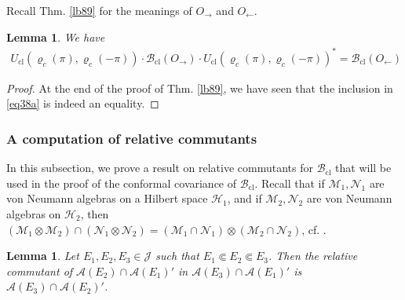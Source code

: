 \documentclass[11pt,b5paper,notitlepage]{article}
\theoremstyle{definition}
\theoremstyle{plain}
\newtheorem{lm}[df]{Lemma}
\newcommand{\mc}{\mathcal}
\newcommand{\MA}{\mathcal A}
\newcommand{\MH}{\mathcal H}
\newcommand{\MJ}{\mathcal J}
\newcommand{\Bcl}{\mathcal B_{\mathrm{cl}}}
\newcommand{\Ucl}{U_{\mathrm{cl}}}
\numberwithin{equation}{section}
\begin{document}
Recall Thm. \ref{lb89} for the meanings of $O_\rightarrow$ and $O_\leftarrow$.

\begin{lm}\label{lb92}
We have
\begin{align*}
\Ucl(\varrho_c(\pi),\varrho_c(-\pi))\cdot\Bcl(O_\rightarrow)\cdot\Ucl(\varrho_c(\pi),\varrho_c(-\pi))^*=\Bcl(O_\leftarrow)
\end{align*}
\end{lm}


\begin{proof}
At the end of the proof of Thm. \ref{lb89}, we have seen that the inclusion in \eqref{eq38a} is indeed an equality.
\end{proof}


\subsubsection{A computation of relative commutants}


In this subsection, we prove a result on relative commutants for $\Bcl$ that will be used in the proof of the conformal covariance of $\Bcl$. Recall that if $\mc M_1,\mc N_1$ are von Neumann algebras on a Hilbert space $\MH_1$, and if $\mc M_2,\mc N_2$ are von Neumann algebras on $\MH_2$, then $(\mc M_1\otimes\mc M_2)\cap(\mc N_1\otimes\mc N_2)=(\mc M_1\cap\mc N_1)\otimes(\mc M_2\cap\mc N_2)$, cf. \cite[III.4.5.9]{Bla06}.


\begin{lm}\label{lb90}
Let $E_1,E_2,E_3\in\MJ$ such that $E_1\Subset E_2\Subset E_3$. Then the relative commutant of $\MA(E_2)\cap\MA(E_1)'$ in $\MA(E_3)\cap\MA(E_1)'$ is $\MA(E_3)\cap\MA(E_2)'$.
\end{lm}
\end{document}
